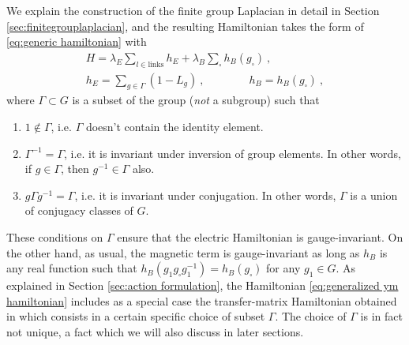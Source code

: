 We explain the construction of the finite group Laplacian in detail in Section \ref{sec:finitegrouplaplacian}, and the resulting Hamiltonian takes the form of \eqref{eq:generic hamiltonian} with
\begin{equation}
    \label{eq:generalized ym hamiltonian}
    \begin{gathered}
        H = \lambda_E \sum_{l \in \mathrm{links}} h_E + \lambda_B \sum_{\square} h_B(g_\square) \ , \\
        h_E = \sum_{g \in \Gamma} (1-L_g)  \ , \quad \quad \quad \quad h_B= h_B (g_\square) \ ,
    \end{gathered}
\end{equation}
where $\Gamma \subset G$ is a subset of the group (\textit{not} a subgroup) such that
\begin{enumerate}
    \item $1 \not \in \Gamma$, i.e.
$\Gamma$ doesn't contain the identity element.
    \item $\Gamma^{-1}=\Gamma$, i.e.
it is invariant under inversion of group elements.
In other words, if $g \in \Gamma$, then $g^{-1} \in \Gamma$ also.
    \item $g \Gamma g^{-1} = \Gamma$, i.e.
it is invariant under conjugation.
In other words, $\Gamma$ is a union of conjugacy classes of $G$.
\end{enumerate}
These conditions on $\Gamma$ ensure that the electric Hamiltonian is gauge-invariant.
On the other hand, as usual, the magnetic term is gauge-invariant as long as $h_B$ is any real function such that $h_B(g_1 g_\square g_1^{-1})=h_B(g_\square)$ for any $g_1 \in G$.
As explained in Section \ref{sec:action formulation}, the Hamiltonian \eqref{eq:generalized ym hamiltonian} includes as a special case the transfer-matrix Hamiltonian obtained in \cite{harlow2018quantum} which consists in a certain specific choice of subset $\Gamma$.
The choice of $\Gamma$ is in fact not unique, a fact which we will also discuss in later sections.

\medskip

